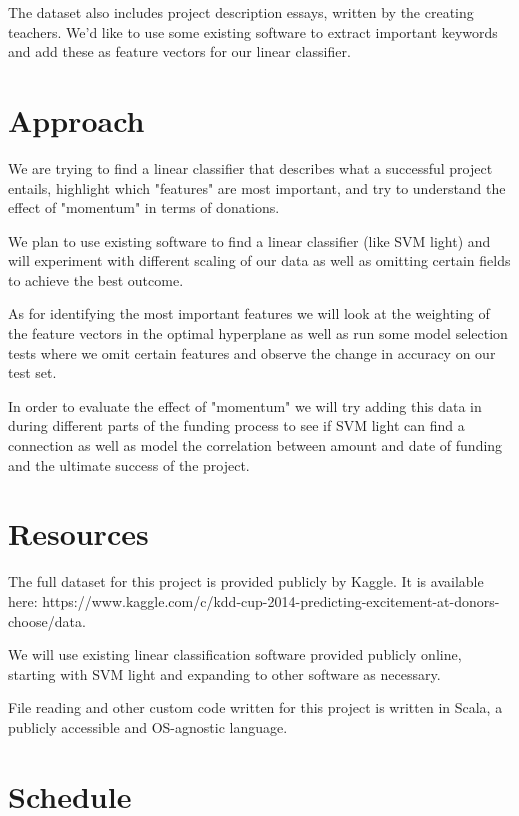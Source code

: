 \documentclass{article}
\begin{document}
The dataset also includes project description essays, written by the creating teachers. We'd like to use some existing software to extract important keywords and add these as feature vectors for our linear classifier.
\section{Approach}

We are trying to find a linear classifier that describes what a successful project entails, highlight which "features" are most important, and try to understand the effect of "momentum" in terms of donations. 

We plan to use existing software to find a linear classifier (like SVM light) and will experiment with different scaling of our data as well as omitting certain fields to achieve the best outcome. 

As for identifying the most important features we will look at the weighting of the feature vectors in the optimal hyperplane as well as run some model selection tests where we omit certain features and observe the change in accuracy on our test set. 

In order to evaluate the effect of "momentum" we will try adding this data in during different parts of the funding process to see if SVM light can find a connection as well as model the correlation between amount and date of funding and the ultimate success of the project. 

\section{Resources}
The full dataset for this project is provided publicly by Kaggle. It is available here: https://www.kaggle.com/c/kdd-cup-2014-predicting-excitement-at-donors-choose/data.

We will use existing linear classification software provided publicly online, starting with SVM light and expanding to other software as necessary.

File reading and other custom code written for this project is written in Scala, a publicly accessible and OS-agnostic language.
\section{Schedule}
\end{document}
